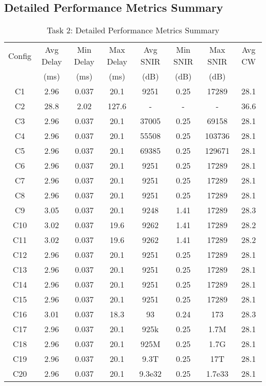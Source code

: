 \documentclass{article}
\begin{document}
\subsection{Detailed Performance Metrics Summary}

\begin{table}[H]
\centering
\caption{Task 2: Detailed Performance Metrics Summary}
\footnotesize
\begin{tabular}{|c|c|c|c|c|c|c|c|}
\hline
Config & Avg Delay & Min Delay & Max Delay & Avg SNIR & Min SNIR & Max SNIR & Avg CW \\
 & (ms) & (ms) & (ms) & (dB) & (dB) & (dB) &  \\
\hline
C1 & 2.96 & 0.037 & 20.1 & 9251 & 0.25 & 17289 & 28.1 \\
C2 & 28.8 & 2.02 & 127.6 & - & - & - & 36.6 \\
C3 & 2.96 & 0.037 & 20.1 & 37005 & 0.25 & 69158 & 28.1 \\
C4 & 2.96 & 0.037 & 20.1 & 55508 & 0.25 & 103736 & 28.1 \\
C5 & 2.96 & 0.037 & 20.1 & 69385 & 0.25 & 129671 & 28.1 \\
C6 & 2.96 & 0.037 & 20.1 & 9251 & 0.25 & 17289 & 28.1 \\
C7 & 2.96 & 0.037 & 20.1 & 9251 & 0.25 & 17289 & 28.1 \\
C8 & 2.96 & 0.037 & 20.1 & 9251 & 0.25 & 17289 & 28.1 \\
C9 & 3.05 & 0.037 & 20.1 & 9248 & 1.41 & 17289 & 28.3 \\
C10 & 3.02 & 0.037 & 19.6 & 9262 & 1.41 & 17289 & 28.2 \\
C11 & 3.02 & 0.037 & 19.6 & 9262 & 1.41 & 17289 & 28.2 \\
C12 & 2.96 & 0.037 & 20.1 & 9251 & 0.25 & 17289 & 28.1 \\
C13 & 2.96 & 0.037 & 20.1 & 9251 & 0.25 & 17289 & 28.1 \\
C14 & 2.96 & 0.037 & 20.1 & 9251 & 0.25 & 17289 & 28.1 \\
C15 & 2.96 & 0.037 & 20.1 & 9251 & 0.25 & 17289 & 28.1 \\
C16 & 3.01 & 0.037 & 18.3 & 93 & 0.24 & 173 & 28.3 \\
C17 & 2.96 & 0.037 & 20.1 & 925k & 0.25 & 1.7M & 28.1 \\
C18 & 2.96 & 0.037 & 20.1 & 925M & 0.25 & 1.7G & 28.1 \\
C19 & 2.96 & 0.037 & 20.1 & 9.3T & 0.25 & 17T & 28.1 \\
C20 & 2.96 & 0.037 & 20.1 & 9.3e32 & 0.25 & 1.7e33 & 28.1 \\
\hline
\end{tabular}
\end{table}
\end{document}
